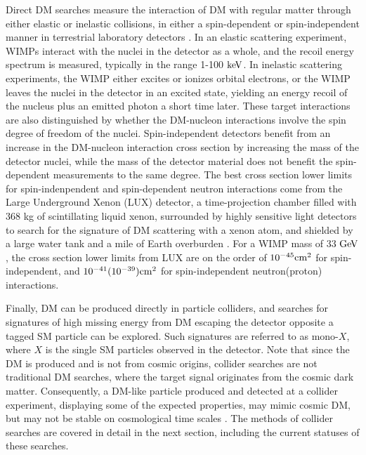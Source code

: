 \indent Direct DM searches measure the interaction of DM with regular matter through either elastic or inelastic collisions, in either a spin-dependent or spin-independent manner in terrestrial laboratory detectors \cite{Bertone:2004pz}. In an elastic scattering experiment, WIMPs interact with the nuclei in the detector as a whole, and the recoil energy spectrum is measured, typically in the range 1-100 $\mathrm{ke\kern -0.1em V}$. In inelastic scattering experiments, the WIMP either excites or ionizes orbital electrons, or the WIMP leaves the nuclei in the detector in an excited state, yielding an energy recoil of the nucleus plus an emitted photon a short time later. These target interactions are also distinguished by whether the DM-nucleon interactions involve the spin degree of freedom of the nuclei. Spin-independent detectors benefit from an increase in the DM-nucleon interaction cross section by increasing the mass of the detector nuclei, while the mass of the detector material does not benefit the spin-dependent measurements to the same degree. The best cross section lower limits for spin-indenpendent and spin-dependent neutron interactions come from the Large Underground Xenon (LUX) detector, a time-projection chamber filled with 368 kg of scintillating liquid xenon, surrounded by highly sensitive light detectors to search for the signature of DM scattering with a xenon atom, and shielded by a large water tank and a mile of Earth overburden \cite{Akerib:2016lao}. For a WIMP mass of 33 $\mathrm{Ge\kern -0.1em V}$, the cross section lower limits from LUX are on the order of $10^{-45} \rm{cm}^2$ for spin-independent, and $10^{-41}(10^{-39}) \rm{cm}^2$ for spin-independent neutron(proton) interactions.

\indent Finally, DM can be produced directly in particle colliders, and searches for signatures of high missing energy from DM escaping the detector opposite a tagged SM particle can be explored. Such signatures are referred to as mono-$X$, where $X$ is the single SM particles observed in the detector. Note that since the DM is produced and is not from cosmic origins, collider searches are not traditional DM searches, where the target signal originates from the cosmic dark matter. Consequently, a DM-like particle produced and detected at a collider experiment, displaying some of the expected properties, may mimic cosmic DM, but may not be stable on cosmological time scales \cite{Askew:2014kqa}. The methods of collider searches are covered in detail in the next section, including the current statuses of these searches. 

